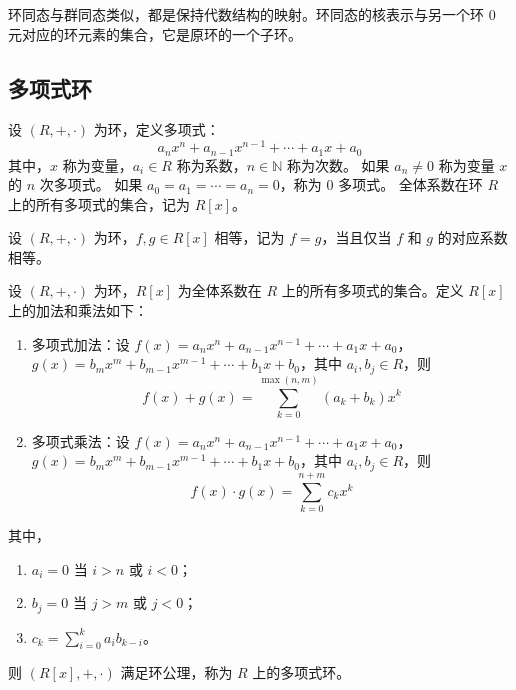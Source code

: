 \begin{note}
    环同态与群同态类似，都是保持代数结构的映射。环同态的核表示与另一个环 $0$ 元对应的环元素的集合，它是原环的一个子环。
\end{note}
\vspace{1em}

\subsection{多项式环}
\begin{definition}
    设 $(R,+,\cdot)$ 为环，定义多项式：
    \[
        a_n x^n + a_{n-1} x^{n-1} + \cdots + a_1 x + a_0
    \]
    其中，$x$ 称为变量，$a_i \in R$ 称为系数，$n \in \mathbb{N}$ 称为次数。
    如果 $a_n \neq 0$ 称为变量 $x$ 的 $n$ 次多项式。
    如果 $a_0=a_1=\cdots=a_n=0$，称为 0 多项式。
    全体系数在环 $R$ 上的所有多项式的集合，记为 $R[x]$。
    \label{def:polynomial}
\end{definition}

\begin{definition}[等于关系]
    设 $(R,+,\cdot)$ 为环，$f,g\in R[x]$ 相等，记为 $f=g$，当且仅当 $f$ 和 $g$ 的对应系数相等。
\end{definition}

\begin{definition}
    设 $(R,+,\cdot)$ 为环，$R[x]$ 为全体系数在 $R$ 上的所有多项式的集合。定义 $R[x]$ 上的加法和乘法如下：
    \begin{enumerate}
        \item 多项式加法：设 $f(x)=a_n x^n + a_{n-1} x^{n-1} + \cdots + a_1 x + a_0$，$g(x)=b_m x^m + b_{m-1} x^{m-1} + \cdots + b_1 x + b_0$，其中 $a_i,b_j \in R$，则
            \[
                f(x)+g(x) = \sum_{k=0}^{\max(n,m)} (a_k+b_k) x^k
            \]
        \item 多项式乘法：设 $f(x)=a_n x^n + a_{n-1} x^{n-1} + \cdots + a_1 x + a_0$，$g(x)=b_m x^m + b_{m-1} x^{m-1} + \cdots + b_1 x + b_0$，其中 $a_i,b_j \in R$，则
            \[
                f(x) \cdot g(x) = \sum_{k=0}^{n+m} c_k x^k
            \]
    \end{enumerate}
    其中，
    \begin{enumerate}
        \item $a_i = 0$ 当 $i>n$ 或 $i<0$；
        \item $b_j = 0$ 当 $j>m$ 或 $j<0$；
        \item $c_k = \sum_{i=0}^{k} a_i b_{k-i}$。
    \end{enumerate}
    则 $(R[x],+,\cdot)$ 满足环公理，称为 $R$ 上的多项式环。
    \label{def:polynomial_ring}
\end{definition}

